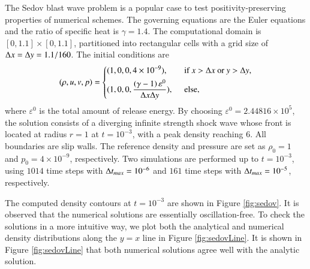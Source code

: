 The Sedov blast wave problem \cite{zhang2012positivity,vilar2016positivity} is a popular case to test positivity-preserving properties of
numerical schemes.
The governing equations are the Euler equations and the ratio of specific heat is $\gamma = 1.4$. The computational domain is $[0,1.1]\times[0,1.1]$, partitioned into rectangular cells with a grid size of $\mathrm\Delta x = \mathrm\Delta y = 1.1/160$. The initial conditions are
\begin{equation}
    (\rho,u,v,p) = \begin{dcases}
        (1,0,0,4\times 10 ^{-9}),\ \                                          & \text{if } x > \inc x \ \mathrm{or} \ y > \inc y, \\
        (1,0,0,\dfrac{\left(\gamma-1\right)\varepsilon^0}{\inc x\inc y}),\ \  & \text{else},                                      \\
    \end{dcases}
\end{equation}
where $\varepsilon^0$ is the total amount of release energy.
By choosing $\varepsilon^0= 2.44816\times 10^5$,
the solution consists of a diverging infinite strength shock wave
whose front is located at radius $r=1$ at $t=10^{-3}$, with a peak density reaching $6$.
All boundaries are slip walls.
The reference density and pressure are set as $\rho_0=1$ and $p_0=4\times10^{-9}$, respectively.
Two simulations are performed up to $t=10^{-3}$,
using $1014$ time steps with $\mathrm\Delta t_{max} = 10^{-6}$
and  $161$ time steps with $\mathrm\Delta t_{max} = 10^{-5}$, respectively.

The computed density contours at $t=10^{-3}$ are shown in Figure \ref{fig:sedov}. It is observed that the numerical solutions are essentially oscillation-free. To check the solutions in a more intuitive way, we plot both the analytical and numerical density distributions along the $y=x$ line in Figure \ref{fig:sedovLine}.
It is shown in Figure \ref{fig:sedovLine} that both numerical solutions agree well with the analytic solution.


